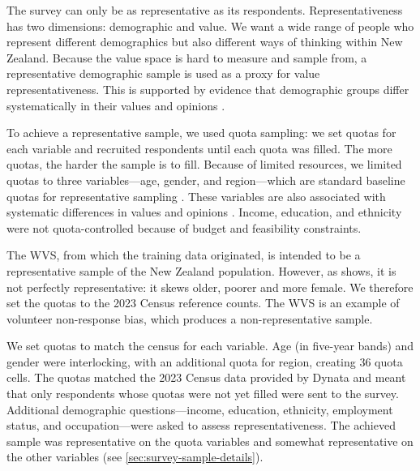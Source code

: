 The survey can only be as representative as its respondents. Representativeness has two dimensions: demographic and value. We want a wide range of people who represent different demographics but also different ways of thinking within New Zealand. Because the value space is hard to measure and sample from, a representative demographic sample is used as a proxy for value representativeness. This is supported by evidence that demographic groups differ systematically in their values and opinions \cite{santurkarWhoseOpinionsLanguage2023,wightmanPeopleAreNot2026,magunBetweenCountryValueDiversity2016}.

To achieve a representative sample, we used quota sampling: we set quotas for each variable and recruited respondents until each quota was filled. The more quotas, the harder the sample is to fill. Because of limited resources, we limited quotas to three variables—age, gender, and region—which are standard baseline quotas for representative sampling \cite{statsnz2023gss,satherley2023polling}. These variables are also associated with systematic differences in values and opinions \cite{wightmanPeopleAreNot2026,magunBetweenCountryValueDiversity2016}. Income, education, and ethnicity were not quota-controlled because of budget and feasibility constraints.

The WVS, from which the training data originated, is intended to be a representative sample of the New Zealand population. However, as  shows, it is not perfectly representative: it skews older, poorer and more female. We therefore set the quotas to the 2023 Census reference counts. The WVS is an example of volunteer non-response bias, which produces a non-representative sample.


We set quotas to match the census for each variable. Age (in five-year bands) and gender were interlocking, with an additional quota for region, creating 36 quota cells. The quotas matched the 2023 Census data provided by Dynata and meant that only respondents whose quotas were not yet filled were sent to the survey. Additional demographic questions—income, education, ethnicity, employment status, and occupation—were asked to assess representativeness. The achieved sample was representative on the quota variables and somewhat representative on the other variables (see \ref{sec:survey-sample-details}).


